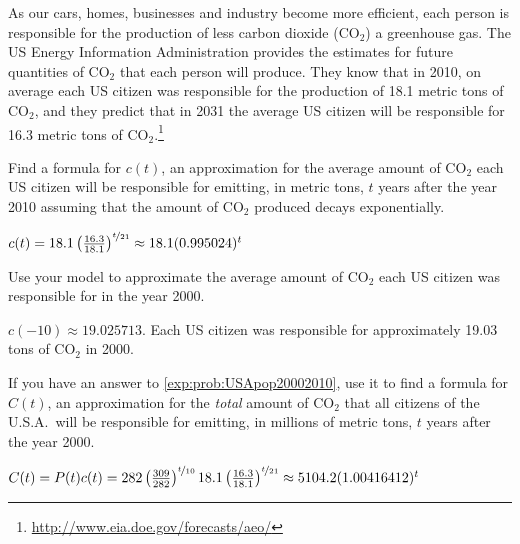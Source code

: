 \begin{problem}\label{exp:prob:greenhouseorig}%
As our cars, homes, businesses and industry become more efficient, each person is responsible for the production of  
less carbon dioxide (CO$_{2}$) a greenhouse gas. The US Energy Information Administration 
provides the estimates for future quantities of CO$_{2}$ that each person will produce. They know 
that in 2010, on average each US citizen was responsible for the production of 18.1 metric tons of CO$_{2}$, and they predict 
that in 2031 the average US citizen will be responsible for 16.3 metric tons of CO$_{2}$.\footnote{\href{http://www.eia.doe.gov/forecasts/aeo/}{http://www.eia.doe.gov/forecasts/aeo/}}
\begin{subproblem}
	Find a formula for $c(t)$, an approximation for the average amount of CO$_{2}$ each US citizen 
	will be responsible for emitting, in metric tons, $t$ years after the year 2010 assuming that the 
	amount of CO$_{2}$ produced decays exponentially.
	\begin{shortsolution}
		$c(t) = 18.1\left( \frac{16.3}{18.1} \right)^{\nicefrac{t}{21}}\approx 18.1(0.995024)^t$
	\end{shortsolution}
\end{subproblem}		
\begin{subproblem}
	Use your model to approximate the average amount of CO$_2$ each US citizen was responsible for in the 
	year 2000.
	\begin{shortsolution}
		$c(-10)\approx 19.025713$.  Each US citizen was responsible for approximately 19.03 tons of CO$_2$ in 2000.
	\end{shortsolution}
\end{subproblem}
\begin{subproblem}
	If you have an answer to \cref{exp:prob:USApop20002010}, use it to find a formula for $C(t)$, an approximation for the \emph{total} amount 
	of CO$_{2}$ that all citizens of the U.S.A.\  
	will be responsible for emitting, in millions of metric tons, $t$ years after the year 2000.
	\begin{shortsolution}
		$C(t)=P(t)c(t)=282\left( \frac{309}{282} \right)^{\nicefrac{t}{10}}18.1\left( \frac{16.3}{18.1} \right)^{\nicefrac{t}{21}}\approx5104.2(1.00416412)^t$
	\end{shortsolution}
\end{subproblem}		
\end{problem}
			
